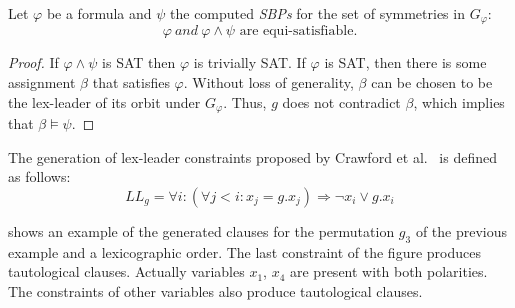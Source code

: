\begin{theorem}
 \label{theorem:satisfiability_preservation_SBPs}
 Let $\varphi$ be a formula and $\psi$ the computed \textit{SBPs} for the set of symmetries in $G_{\varphi}$: 
 $$\varphi~and ~\varphi \wedge \psi \text{ are equi-satisfiable}.$$
\end{theorem}

\begin{proof}
 If $\varphi \wedge \psi$ is SAT then $\varphi$ is trivially SAT. If
 $\varphi$ is SAT, then there is some assignment $\beta$ that satisfies $\varphi$.
 Without loss of generality, $\beta$ can be chosen to be the lex-leader of its
 orbit under $G_{\varphi}$. Thus, $g$ does not contradict $\beta$, which implies that
 $\beta \models \psi$.
\end{proof}

%
%
%
The generation of lex-leader constraints proposed by Crawford et al.~\cite{crawford1996symmetry} is defined as follows:
$$ LL_g = \forall i : (\forall j < i : x_j = g.x_j) \Rightarrow  \neg x_i \lor g.x_i$$
 
  shows an example of the generated clauses for the  permutation $g_3$ of the previous 
 example and a lexicographic order. The last constraint of the figure produces tautological clauses.
 Actually variables $x_1$, $x_4$ are present with both polarities. The constraints of other variables also produce 
 tautological clauses. 
 
